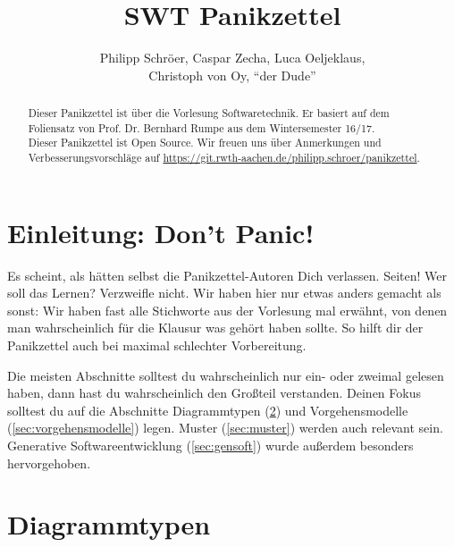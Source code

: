 \documentclass{panikzettel}
\title{SWT Panikzettel}
\author{Philipp Schröer, Caspar Zecha, Luca Oeljeklaus,\\Christoph von Oy, ``der Dude''}
\begin{document}
\maketitle

\begin{abstract}%
  Dieser Panikzettel ist über die Vorlesung Softwaretechnik. Er basiert auf dem Foliensatz von Prof. Dr. Bernhard Rumpe aus dem Wintersemester 16/17.	\\
  Dieser Panikzettel ist Open Source. Wir freuen uns über Anmerkungen und Verbesserungsvorschläge auf \url{https://git.rwth-aachen.de/philipp.schroer/panikzettel}.
\end{abstract}

\tableofcontents

\newpage

\section{Einleitung: Don't Panic!}

Es scheint, als hätten selbst die Panikzettel-Autoren Dich verlassen.
\pageref{LastPage} Seiten!
Wer soll das Lernen?
Verzweifle nicht.
Wir haben hier nur etwas anders gemacht als sonst: Wir haben fast alle Stichworte aus der Vorlesung mal erwähnt, von denen man wahrscheinlich für die Klausur was gehört haben sollte.
So hilft dir der Panikzettel auch bei maximal schlechter Vorbereitung.

Die meisten Abschnitte solltest du wahrscheinlich nur ein- oder zweimal gelesen haben, dann hast du wahrscheinlich den Großteil verstanden.
Deinen Fokus solltest du auf die Abschnitte Diagrammtypen (\ref{sec:diagrammtypen}) und Vorgehensmodelle (\ref{sec:vorgehensmodelle}) legen.
Muster (\ref{sec:muster}) werden auch relevant sein.
Generative Softwareentwicklung (\ref{sec:gensoft}) wurde außerdem besonders hervorgehoben.

\section{Diagrammtypen}
\label{sec:diagrammtypen}
\end{document}
